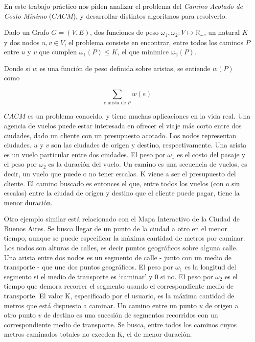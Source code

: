 
En este trabajo pr\'actico nos piden analizar el problema del \textit{Camino Acotado de Costo M\'inimo} ($CACM$), y desarrollar distintos algoritmos para resolverlo. 

Dado un Grafo $G = (V,E)$, dos funciones de peso $\omega_1, \omega_2: V \mapsto \mathbb{R}_+$, un natural $K$ y dos nodos $u,v \in V$, el problema consiste en encontrar, entre todos los caminos $P$ entre $u$ y $v$ que cumplen $\omega_1(P) \leq K$, el que minimice $\omega_2(P)$. 

Donde si $w$ es una función de peso definida sobre aristas, se entiende $w(P)$ como 

\begin{equation*}
\sum_{e \text{ arista de } P} w(e)
\end{equation*}

$CACM$ es un problema conocido, y tiene muchas aplicaciones en la vida real. Una agencia de vuelos puede estar interesada en ofrecer el viaje más corto entre dos ciudades, dado un cliente con un presupuesto acotado. Los nodos representan ciudades. $u$ y $v$ son las ciudades de origen y destino, respectivamente. Una arista es un vuelo particular entre dos ciudades. El peso por $\omega_1$ es el costo del pasaje y el peso por $\omega_2$  es la duración del vuelo. Un camino es una secuencia de vuelos, es decir, un vuelo que puede o no tener escalas. K viene a ser el presupuesto del cliente. El camino buscado es entonces el que, entre todos los vuelos (con o sin escalas) entre la ciudad de origen y destino que el cliente puede pagar, tiene la menor duración.

Otro ejemplo similar está relacionado con el Mapa Interactivo de la Ciudad de Buenos Aires. Se busca llegar de un punto de la ciudad a otro en el
menor tiempo, aunque se puede especificar la máxima cantidad de metros por caminar. Los nodos son alturas de calles, es decir puntos geográficos sobre alguna calle. Una arista entre dos nodos es un segmento de calle - junto con un medio de transporte - que une dos puntos geográficos. El peso por $\omega_1$ es la longitud del segmento si el medio de transporte es `caminar' y 0 si no. El peso por $\omega_2$ es el tiempo que demora recorrer el segmento usando el correspondiente medio de transporte. El valor K, especificado por el usuario, es la máxima cantidad de metros que está dispuesto a caminar. Un camino entre un punto $u$ de origen a otro punto $v$ de destino es una sucesión de segmentos recorridos con un correspondiente medio de transporte. Se busca, entre todos los caminos cuyos metros caminados totales no exceden K, el de menor duración.

